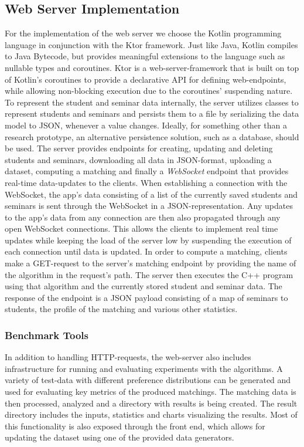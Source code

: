 \subsection{Web Server Implementation}
For the implementation of the web server we choose the Kotlin programming language in conjunction with the Ktor framework. Just like Java, Kotlin compiles to Java Bytecode, but provides meaningful extensions to the language such as nullable types and coroutines. Ktor is a web-server-framework that is built on top of Kotlin's coroutines to provide a declarative API for defining web-endpoints, while allowing non-blocking execution due to the coroutines' suspending nature. 
To represent the student and seminar data internally, the server utilizes classes to represent students and seminars and persists them to a file by serializing the data model to JSON, whenever a value changes. Ideally, for something other than a research prototype, an alternative persistence solution, such as a database, should be used. The server provides endpoints for creating, updating and deleting students and seminars, downloading all data in JSON-format, uploading a dataset, computing a matching and finally a \emph{WebSocket} endpoint that provides real-time data-updates to the clients. When establishing a connection with the WebSocket, the app's data consisting of a list of the currently saved students and seminars is sent through the WebSocket in a JSON-representation. Any updates to the app's data from any connection are then also propagated through any open WebSocket connections. This allows the clients to implement real time updates while keeping the load of the server low by suspending the execution of each connection until data is updated. In order to compute a matching, clients make a GET-request to the server's matching endpoint by providing the name of the algorithm in the request's path. The server then executes the C++ program using that algorithm and the currently stored student and seminar data. The response of the endpoint is a JSON payload consisting of a map of seminars to students, the profile of the matching and various other statistics.

\subsubsection{Benchmark Tools}
In addition to handling HTTP-requests, the web-server also includes infrastructure for running and evaluating experiments with the algorithms. A variety of test-data with different preference distributions can be generated and used for evaluating key metrics of the produced matchings. The matching data is then processed, analyzed and a directory with results is being created. The result directory includes the inputs, statistics and charts visualizing the results. Most of this functionality is also exposed through the front end, which allows for updating the dataset using one of the provided data generators.

